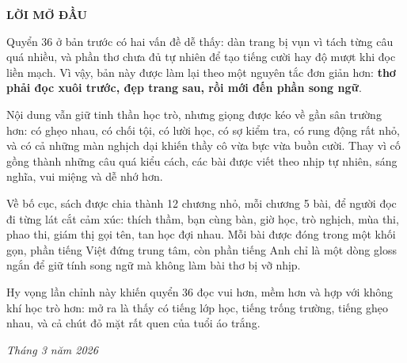 \thispagestyle{empty}
\vspace*{2.0cm}

\begin{center}
{\Large\bfseries\color{titlecolor} LỜI MỞ ĐẦU\par}
\end{center}

\vspace{1.05cm}

Quyển 36 ở bản trước có hai vấn đề dễ thấy: dàn trang bị vụn vì tách từng câu quá nhiều, và phần thơ chưa đủ tự nhiên để tạo tiếng cười hay độ mượt khi đọc liền mạch. Vì vậy, bản này được làm lại theo một nguyên tắc đơn giản hơn: \textbf{thơ phải đọc xuôi trước, đẹp trang sau, rồi mới đến phần song ngữ}.\par

Nội dung vẫn giữ tinh thần học trò, nhưng giọng được kéo về gần sân trường hơn: có ghẹo nhau, có chối tội, có lười học, có sợ kiểm tra, có rung động rất nhỏ, và có cả những màn nghịch dại khiến thầy cô vừa bực vừa buồn cười. Thay vì cố gồng thành những câu quá kiểu cách, các bài được viết theo nhịp tự nhiên, sáng nghĩa, vui miệng và dễ nhớ hơn.\par

Về bố cục, sách được chia thành 12 chương nhỏ, mỗi chương 5 bài, để người đọc đi từng lát cắt cảm xúc: thích thầm, bạn cùng bàn, giờ học, trò nghịch, mùa thi, phao thi, giám thị gọi tên, tan học đợi nhau. Mỗi bài được đóng trong một khối gọn, phần tiếng Việt đứng trung tâm, còn phần tiếng Anh chỉ là một dòng gloss ngắn để giữ tính song ngữ mà không làm bài thơ bị vỡ nhịp.\par

Hy vọng lần chỉnh này khiến quyển 36 đọc vui hơn, mềm hơn và hợp với không khí học trò hơn: mở ra là thấy có tiếng lớp học, tiếng trống trường, tiếng ghẹo nhau, và cả chút đỏ mặt rất quen của tuổi áo trắng.

\vfill
\begin{flushright}
\textit{Tháng 3 năm 2026}
\end{flushright}

\clearpage
